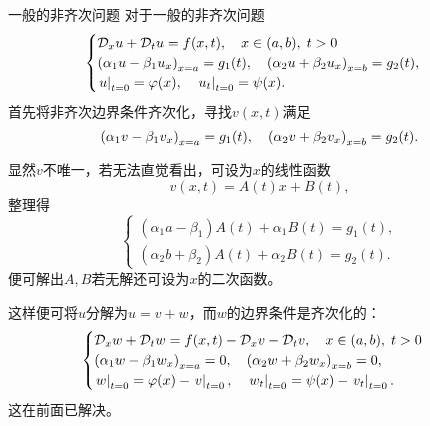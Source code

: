 \begin{method}{一般的非齐次问题}{}
	对于一般的非齐次问题
	\begin{align*}
		\begin{cases}
			\mathcal D_xu+\mathcal D_tu=f(x,t),\quad x\in(a,b),\;t>0\\
			\left(\alpha_1u-\beta_1u_x\right)_{x=a}=g_1(t),\quad\left(\alpha_2u+\beta_2u_x\right)_{x=b}=g_2(t),\\
			\left.u\right\rvert_{t=0}=\varphi(x),\quad\left.u_t\right\rvert_{t=0}=\psi(x).
		\end{cases}
	\end{align*}
	首先将非齐次边界条件齐次化，寻找$v(x,t)$满足 
	\[
		\left(\alpha_1v-\beta_1v_x\right)_{x=a}=g_1(t),\quad\left(\alpha_2v+\beta_2v_x\right)_{x=b}=g_2(t).
	\]
	
	显然$v$不唯一，若无法直觉看出，可设为$x$的线性函数
	\[
		v(x,t)=A(t)x+B(t),
	\]
	整理得
	\[
		\begin{cases}
			(\alpha_1a-\beta_1)A(t)+\alpha_1B(t)=g_1(t),\\
			(\alpha_2b+\beta_2)A(t)+\alpha_2B(t)=g_2(t).
		\end{cases}
	\]
	便可解出$A,B$若无解还可设为$x$的二次函数。
	
	这样便可将$u$分解为$u=v+w$，而$w$的边界条件是齐次化的：
	\begin{align*}
		\begin{cases}
			\mathcal D_xw+\mathcal D_tw=f(x,t)-\mathcal D_xv-\mathcal D_tv,\quad x\in(a,b),\;t>0\\
			\left(\alpha_1w-\beta_1w_x\right)_{x=a}=0,\quad\left(\alpha_2w+\beta_2w_x\right)_{x=b}=0,\\
			\left.w\right\rvert_{t=0}=\varphi(x)-\left.v\right\rvert_{t=0},\quad\left.w_t\right\rvert_{t=0}=\psi(x)-\left.v_t\right\rvert_{t=0}.
		\end{cases}
	\end{align*}
	这在前面已解决。
\end{method}


